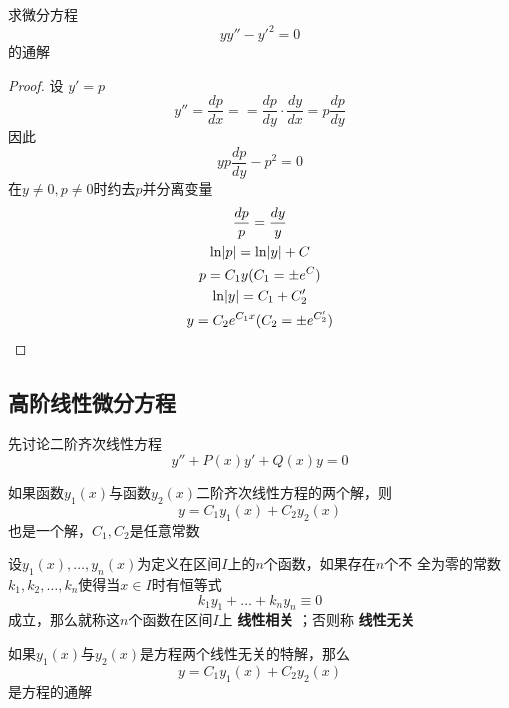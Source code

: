 \documentclass[11pt]{article}
\begin{document}
\begin{proposition}[]
求微分方程
\begin{equation*}
yy''-y'^2=0
\end{equation*}
的通解
\end{proposition}

\begin{proof}
设 \(y'=p\)
\begin{equation*}
y''=\frac{dp}{dx}==\frac{dp}{dy}\cdot\frac{dy}{dx}=p\frac{dp}{dy}
\end{equation*}
因此
\begin{equation*}
yp\frac{dp}{dy}-p^2=0
\end{equation*}
在\(y\neq0,p\neq0\)时约去\(p\)并分离变量
\begin{gather*}
\frac{dp}{p}=\frac{dy}{y}\\
\ln\abs{p}=\ln\abs{y}+C\\
p=C_1y(C_1=\pm e^C)\\
\ln\abs{y}=C_1+C_2'\\
y=C_2e^{C_1x}(C_2=\pm e^{C_2'})
\end{gather*}
\end{proof}
\subsection{高阶线性微分方程}
\label{sec:org968fd4d}
先讨论二阶齐次线性方程
\begin{equation*}
y''+P(x)y'+Q(x)y=0
\end{equation*}
\begin{theorem}[]
如果函数\(y_1(x)\)与函数\(y_2(x)\)二阶齐次线性方程的两个解，则
\begin{equation*}
y=C_1y_1(x)+C_2y_2(x)
\end{equation*}
也是一个解，\(C_1,C_2\)是任意常数
\end{theorem}

设\(y_1(x),\dots,y_n(x)\)为定义在区间\(I\)上的\(n\)个函数，如果存在\(n\)个不
全为零的常数\(k_1,k_2,\dots,k_n\)使得当\(x\in I\)时有恒等式
\begin{equation*}
k_1y_1+\dots+k_ny_n\equiv0
\end{equation*}
成立，那么就称这\(n\)个函数在区间\(I\)上 \textbf{线性相关} ；否则称 \textbf{线性无关}

\begin{theorem}[]
如果\(y_1(x)\)与\(y_2(x)\)是方程两个线性无关的特解，那么
\begin{equation*}
y=C_1y_1(x)+C_2y_2(x)
\end{equation*}
是方程的通解
\end{theorem}
\end{document}
